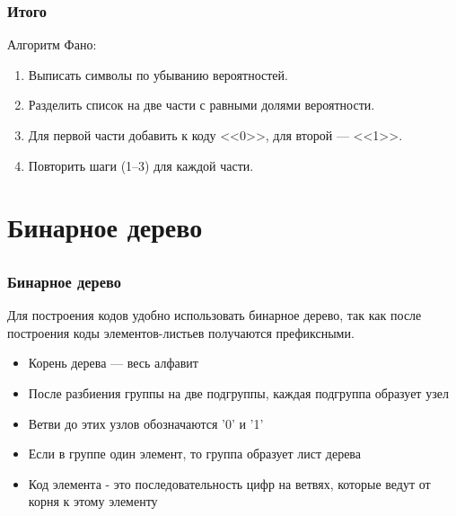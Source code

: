 \documentclass[10pt,pdf,hyperref={unicode}]{beamer}
\begin{document}
	\begin{frame}
		\frametitle{Итого}
		Алгоритм Фано:
		\begin{enumerate}
			\item Выписать символы по убыванию вероятностей.
			\item Разделить список на две части с равными долями вероятности.
			\item Для первой части добавить к коду <<0>>, для второй --- <<1>>.
			\item Повторить шаги (1--3) для каждой части.
		\end{enumerate}
	\end{frame}

\section{Бинарное дерево}
\subsection{}

	\begin{frame}
		\frametitle{Бинарное дерево}
			Для построения кодов удобно использовать бинарное дерево, так как 
			после построения коды элементов-листьев получаются префиксными.
		\begin{itemize}
			\item Корень дерева --- весь алфавит
			\item После разбиения группы на две подгруппы, каждая подгруппа образует узел
			\item Ветви до этих узлов обозначаются '0' и '1'
			\item Если в группе один элемент, то группа образует лист дерева
			\item Код элемента - это последовательность цифр на ветвях, которые ведут от корня к этому элементу
		\end{itemize}

	\end{frame}
\end{document}
